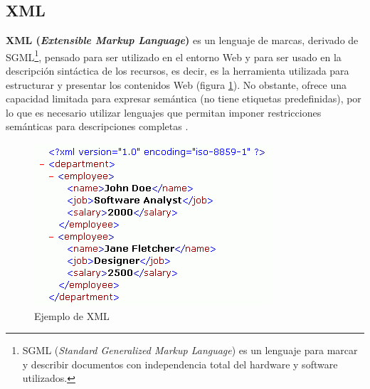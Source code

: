 \subsection{XML} %






\textbf{XML (\textit{Extensible Markup Language})} es un lenguaje de marcas, derivado de SGML\footnote{SGML (\textit{Standard Generalized Markup Language}) es un lenguaje para marcar y describir documentos con independencia total del hardware y software utilizados.}, pensado para ser utilizado en el entorno Web y para ser usado en la descripción sintáctica de los recursos, es decir, es la herramienta utilizada para estructurar y presentar los contenidos Web (figura \ref{fig:xml}). No obstante, ofrece una capacidad limitada para expresar semántica (no tiene etiquetas predefinidas), por lo que es necesario utilizar lenguajes que permitan imponer restricciones semánticas para descripciones completas \cite{aplicacion}.

\begin{figure}[H]
	\centering
	\includegraphics[width=0.45\linewidth]{imagenes/capitulo3/xml}
	\caption{Ejemplo de XML \cite{imagen-xml}}
	\label{fig:xml}
\end{figure}


